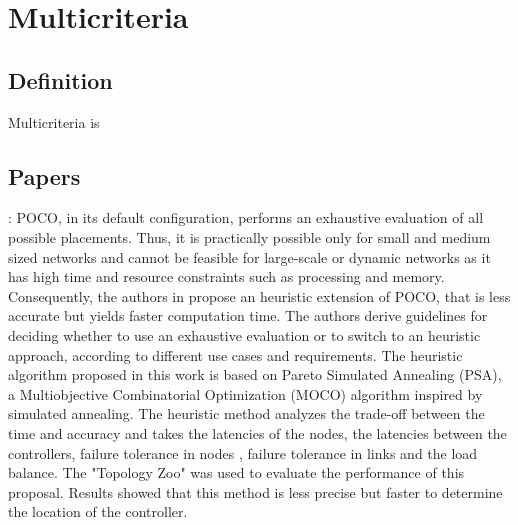 \documentclass[a4paper,10pt]{article}
\begin{document}
%
%
%
%

\section{Multicriteria}
\subsection{Definition}
Multicriteria is

\subsection{Papers}
\cite{LaGe15}: POCO, in its default configuration, performs an exhaustive evaluation of all possible placements. Thus, it is practically possible only for small and medium sized networks and cannot be feasible for large-scale or dynamic networks as it has high time and resource constraints such as processing and memory. 
Consequently, the authors in \cite{LaGe15} propose an heuristic extension of POCO, that is less accurate but yields faster computation time. The authors derive guidelines for deciding whether to use an exhaustive evaluation or to switch to an heuristic approach, according to different use cases and requirements. The heuristic algorithm proposed in this work is based on Pareto Simulated Annealing (PSA), a Multiobjective Combinatorial Optimization (MOCO) algorithm inspired by simulated annealing. The heuristic method analyzes the trade-off between the time and accuracy and takes the latencies of the nodes, the latencies between the controllers, failure tolerance in nodes , failure tolerance in links and the load balance. The "Topology Zoo" was used to evaluate the performance of this proposal. Results showed that this method is less precise but faster to determine the location of the controller.
\end{document}
